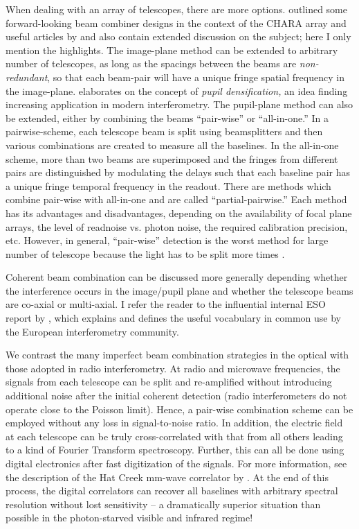 \documentclass[12pt]{iopart}
\begin{document}
When dealing with an array of telescopes, there are more options.
\citet{brummelaar1993} outlined some forward-looking beam combiner
designs in the context of the CHARA array and useful articles
by \citet{mozurk2000} and \citet{mariotti1992} also contain extended
discussion on the subject; here I only mention the highlights.  The
image-plane method can be extended to arbitrary number of telescopes,
as long as the spacings between the beams are {\em non-redundant}, so
that each beam-pair will have a unique fringe spatial frequency in the
image-plane.  \citet{labeyrie1996} elaborates on the concept of
{\em pupil densification,} an idea finding increasing application in
modern interferometry.  The pupil-plane method can also be extended,
either by combining the beams ``pair-wise'' or ``all-in-one.''  In a
pairwise-scheme, each telescope beam is split using beamsplitters and
then various combinations are created to measure all the baselines.
In the all-in-one scheme, more than two beams are superimposed and the
fringes from different pairs are distinguished by modulating the
delays such that each baseline pair has a unique fringe temporal
frequency in the readout.  There are methods which combine pair-wise
with all-in-one and are called ``partial-pairwise.''  Each method has
its advantages and disadvantages, depending on the availability of
focal plane arrays, the level of readnoise vs. photon noise, the
required calibration precision, etc.  However, in general,
``pair-wise'' detection is the worst method for large number of
telescope because the light has to be split more times
\citep[see][although beware of some important simplifications made in
this analysis]{buscher_thesis}.

Coherent beam combination can be discussed more generally depending 
whether the interference occurs in the image/pupil plane and whether the
telescope beams are co-axial or multi-axial.  I refer the reader to
the influential internal ESO report by \citet{mariotti1992}, which
explains and defines the useful vocabulary in common use by the European
interferometry community.

We contrast the many imperfect beam combination strategies in the
optical with those adopted in radio interferometry.  At radio and
microwave frequencies, the signals from each telescope can be split
and re-amplified without introducing additional noise after the
initial coherent detection (radio interferometers do not operate
close to the Poisson limit).  Hence, a pair-wise combination
scheme can be employed without any loss in signal-to-noise ratio.  In
addition, the electric field at each telescope can be truly
cross-correlated with that from all others leading to a kind of Fourier
Transform spectroscopy.  Further, this can all be done using digital
electronics after fast digitization of the signals.  For more
information, see the description of the Hat Creek mm-wave
correlator by \citet{hudson85}.  At the end of this process, the
digital correlators can recover all baselines with arbitrary spectral
resolution without lost sensitivity -- a dramatically superior
situation than possible in the photon-starved visible and infrared
regime!
\end{document}
